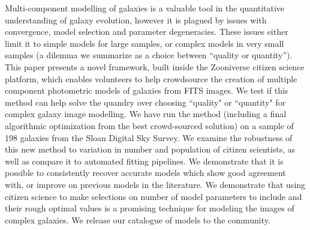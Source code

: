 \documentclass[../main.tex]{subfiles}
\begin{document}
Multi-component modelling of galaxies is a valuable tool in the quantitative understanding of galaxy evolution, however it is plagued by issues with convergence, model selection and parameter degeneracies. These issues either limit it to simple models for large samples, or complex models in very small samples  (a dilemma we summarize as a choice between “quality or quantity”). This paper presents a novel framework, built inside the Zooniverse citizen science platform, which enables volunteers to help crowdsource the creation of multiple component photometric models of galaxies from FITS images. We test if this method can help solve the quandry over choosing ``quality" or ``quantity" for complex galaxy image modelling.
We have run the method (including a final algorithmic optimization from the best crowd-sourced solution) on a sample of 198 galaxies from the Sloan Digital Sky Survey. We examine the robustness of this new method to variation in number and population of citizen scientists, as well as compare it to automated fitting pipelines. We demonstrate that it is possible to consistently recover accurate models which show good agreement with, or improve on previous models in the literature. We demonstrate that using citizen science to make selections on number of model parameters to include and their rough optimal values is a promising technique for modeling the images of complex galaxies. We release our catalogue of models to the community.
\end{document}
